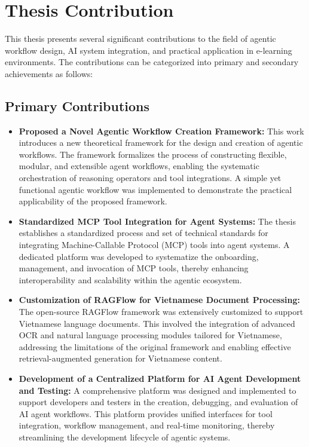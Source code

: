 \documentclass[../Main.tex]{subfiles}
\begin{document}
	\section{Thesis Contribution}
	\label{section:7.1_Thesis_contribution}
	This thesis presents several significant contributions to the field of agentic
	workflow design, AI system integration, and practical application in e-learning
	environments. The contributions can be categorized into primary and secondary
	achievements as follows:
	\subsection{Primary Contributions}
	\label{section:7.1.1_Primary_contributions}
	\begin{itemize}
		\item \textbf{Proposed a Novel Agentic Workflow Creation Framework:} This
			work introduces a new theoretical framework for the design and creation of
			agentic workflows. The framework formalizes the process of constructing flexible,
			modular, and extensible agent workflows, enabling the systematic
			orchestration of reasoning operators and tool integrations. A simple yet functional
			agentic workflow was implemented to demonstrate the practical applicability
			of the proposed framework.

		\item \textbf{Standardized MCP Tool Integration for Agent Systems:} The
			thesis establishes a standardized process and set of technical standards
			for integrating Machine-Callable Protocol (MCP) tools into agent systems. A
			dedicated platform was developed to systematize the onboarding, management,
			and invocation of MCP tools, thereby enhancing interoperability and
			scalability within the agentic ecosystem.

		\item \textbf{Customization of RAGFlow for Vietnamese Document Processing:}
			The open-source RAGFlow framework was extensively customized to support
			Vietnamese language documents. This involved the integration of advanced OCR
			and natural language processing modules tailored for Vietnamese,
			addressing the limitations of the original framework and enabling
			effective retrieval-augmented generation for Vietnamese content.

		\item \textbf{Development of a Centralized Platform for AI Agent Development
			and Testing:} A comprehensive platform was designed and implemented to
			support developers and testers in the creation, debugging, and evaluation
			of AI agent workflows. This platform provides unified interfaces for tool integration,
			workflow management, and real-time monitoring, thereby streamlining the
			development lifecycle of agentic systems.
	\end{itemize}
\end{document}
